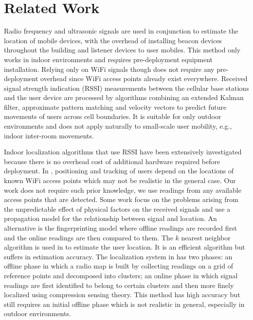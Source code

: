 \section{Related Work}
Radio frequency and ultrasonic signals are used in conjunction
\cite{priyantha2000cricket} to estimate the location of mobile devices, with
the overhead of installing beacon devices throughout the building and listener
devices to user mobiles.  This method only works in indoor environments and
requires pre-deployment equipment installation.  Relying only on WiFi signals
though does not require any pre-deployment overhead since WiFi access points
already exist everywhere.  Received signal strength indication (RSSI)
measurements between the cellular base stations and the user device
\cite{liu1997hierarchical} are processed by algorithms combining an extended
Kalman filter, approximate pattern matching and velocity vectors to predict
future movements of users across cell boundaries.  It is suitable for only
outdoor environments and does not apply naturally to small-scale user mobility,
e.g., indoor inter-room movements.

Indoor localization algorithms that use RSSI have been extensively investigated
\cite{kushki2007kernel,liu2005signal,
hatami2005comparative,paul2008wi,feng2012received} because there is no overhead
cost of additional hardware required before deployment.  In \cite{paul2008wi},
positioning and tracking of users depend on the locations of known WiFi access
points which may not be realistic in the general case.  Our work does not
require such prior knowledge, we use readings from any available access points
that are detected.  Some work \cite{bahl2000radar,ferris2006gaussian} focus on
the problems arising from the unpredictable effect of physical factors on the
received signals and use a propagation model for the relationship between
signal and location.  An alternative is the fingerprinting model
\cite{kaemarungsi2004modeling,li2006indoor, ma2008cluster} where offline
readings are recorded first and the online readings are then compared to them.
The $k$ nearest neighbor algorithm is used in \cite{li2006indoor,ma2008cluster}
to estimate the user location.  It is an efficient algorithm but suffers in
estimation accuracy.  The localization system in \cite{feng2012received} has
two phases: an offline phase in which a radio map is built by collecting
readings on a grid of reference points and decomposed into clusters; an online
phase in which signal readings are first identified to belong to certain
clusters and then more finely localized using compression sensing theory.  This
method has high accuracy but still requires an initial offline phase which is
not realistic in general, especially in outdoor environments.

